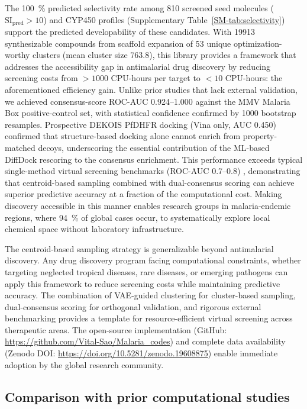 \documentclass[journal=jcisd8,manuscript=article]{achemso}
\begin{document}
The \qty{100}{\percent} predicted selectivity rate among \num{810} screened seed molecules ($\text{SI}_{\text{pred}} > \num{10}$) and CYP450 profiles (Supplementary Table~\ref{SM-tab:selectivity}) support the predicted developability of these candidates. With \num{19913} synthesizable compounds from scaffold expansion of \num{53} unique optimization-worthy clusters (mean cluster size \num{763.8}), this library provides a framework that addresses the accessibility gap in antimalarial drug discovery by reducing screening costs from $>\num{1000}$ CPU-hours per target to $<\num{10}$ CPU-hours: the aforementioned efficiency gain. Unlike prior studies that lack external validation, we achieved consensus-score ROC-AUC \numrange{0.924}{1.000} against the MMV Malaria Box positive-control set, with statistical confidence confirmed by \num{1000} bootstrap resamples. Prospective DEKOIS PfDHFR docking (Vina only, AUC \num{0.450}) confirmed that structure-based docking alone cannot enrich from property-matched decoys, underscoring the essential contribution of the ML-based DiffDock rescoring to the consensus enrichment. This performance exceeds typical single-method virtual screening benchmarks (ROC-AUC \numrange{0.7}{0.8}) \cite{Truchon2007}, demonstrating that centroid-based sampling combined with dual-consensus scoring can achieve superior predictive accuracy at a fraction of the computational cost. Making discovery accessible in this manner enables research groups in malaria-endemic regions, where \qty{94}{\percent} of global cases occur, to systematically explore local chemical space without laboratory infrastructure.

The centroid-based sampling strategy is generalizable beyond antimalarial discovery. Any drug discovery program facing computational constraints, whether targeting neglected tropical diseases, rare diseases, or emerging pathogens can apply this framework to reduce screening costs while maintaining predictive accuracy. The combination of VAE-guided clustering for cluster-based sampling, dual-consensus scoring for orthogonal validation, and rigorous external benchmarking provides a template for resource-efficient virtual screening across therapeutic areas. The open-source implementation (GitHub: \url{https://github.com/Vital-Sao/Malaria_codes}) and complete data availability (Zenodo DOI: \url{https://doi.org/10.5281/zenodo.19608875}) enable immediate adoption by the global research community.

\subsection*{Comparison with prior computational studies}
\end{document}
